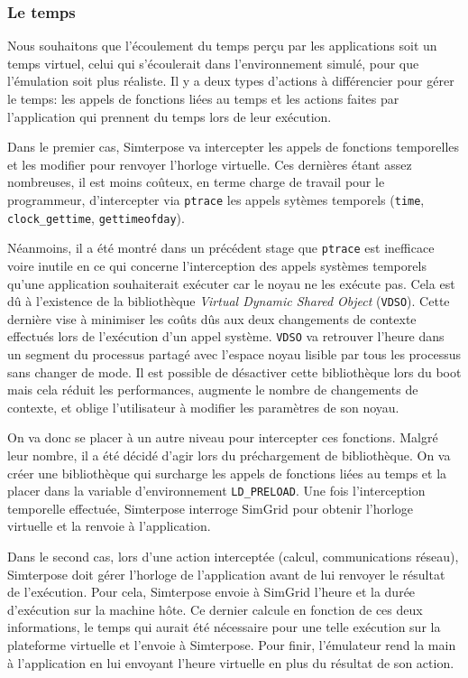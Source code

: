 \subsubsection{Le temps}
\label{subsubsection:time}

Nous souhaitons que l'écoulement du temps perçu par les applications soit un
temps virtuel, celui qui s'écoulerait dans l'environnement simulé, pour que
l'émulation soit plus réaliste. Il y a deux types d'actions à différencier pour
gérer le temps: les appels de fonctions liées au temps et les actions faites par
l'application qui prennent du temps lors de leur exécution.

Dans le premier cas, Simterpose va intercepter les appels de fonctions
temporelles et les modifier pour renvoyer l'horloge virtuelle. Ces dernières étant
assez nombreuses, il est moins coûteux, en terme charge de travail pour
le programmeur, d'intercepter via
\texttt{ptrace} les appels sytèmes temporels (\texttt{time},
\texttt{clock\_gettime}, \texttt{gettimeofday}).

Néanmoins, il a été montré dans un précédent stage \citep{CHLOE:Emulationapplicationdistribuees} que \texttt{ptrace} est inefficace
voire inutile en ce qui concerne l'interception des appels systèmes temporels
qu'une application souhaiterait exécuter car le noyau ne les exécute pas. Cela
est dû à l'existence de la bibliothèque \textit{Virtual Dynamic Shared Object}
(\texttt{VDSO}). Cette dernière vise à minimiser les coûts dûs aux deux changements de contexte effectués lors de l'exécution d'un appel système. \texttt{VDSO} va retrouver l'heure dans un segment du processus partagé avec l'espace noyau lisible par tous les processus sans changer de mode. Il est possible de désactiver cette bibliothèque lors du boot mais cela réduit les performances, augmente le nombre de changements de contexte, et oblige l'utilisateur à modifier les paramètres de son noyau.

On va donc se placer à un autre niveau pour intercepter ces
fonctions. Malgré leur nombre, il a été décidé d'agir lors du
préchargement de bibliothèque. On va créer une bibliothèque qui
surcharge les appels de fonctions liées au temps et la placer dans la
variable d'environnement \texttt{LD\_PRELOAD}. Une fois l'interception
temporelle effectuée, Simterpose interroge SimGrid pour obtenir
l'horloge virtuelle et la renvoie à l'application.

Dans le second cas, lors d'une action interceptée (calcul, communications
réseau), Simterpose doit gérer l'horloge de l'application avant de lui renvoyer
le résultat de l'exécution. Pour cela, Simterpose envoie à SimGrid l'heure et la
durée d'exécution sur la machine hôte. Ce dernier calcule en fonction de ces
deux informations, le temps qui aurait été nécessaire pour une telle exécution
sur la plateforme virtuelle et l'envoie à Simterpose. Pour finir, l'émulateur
rend la main à l'application en lui envoyant l'heure virtuelle en plus du
résultat de son action.
